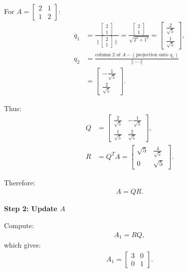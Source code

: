 \documentclass[journal]{IEEEtran}
\begin{document}
\begin{enumerate}
For $A = \begin{bmatrix} 2 & 1 \\ 1 & 2 \end{bmatrix}$:
\begin{align}
    q_1 &= \frac{\begin{bmatrix} 2 \\ 1 \end{bmatrix}}{\|\begin{bmatrix} 2 \\ 1 \end{bmatrix}\|} 
    = \frac{\begin{bmatrix} 2 \\ 1 \end{bmatrix}}{\sqrt{2^2 + 1^2}} 
    = \begin{bmatrix} \frac{2}{\sqrt{5}} \\ \frac{1}{\sqrt{5}} \end{bmatrix}, \\
    q_2 &= \frac{\text{column 2 of } A - (\text{projection onto } q_1)}{\| \cdots \|} \\
    &= \begin{bmatrix} -\frac{1}{\sqrt{5}} \\ \frac{2}{\sqrt{5}} \end{bmatrix}.
\end{align}

Thus:
\begin{align}
    Q &= \begin{bmatrix} \frac{2}{\sqrt{5}} & -\frac{1}{\sqrt{5}} \\ \frac{1}{\sqrt{5}} & \frac{2}{\sqrt{5}} \end{bmatrix}, \\
    R &= Q^T A = \begin{bmatrix} \sqrt{5} & \frac{4}{\sqrt{5}} \\ 0 & \sqrt{5} \end{bmatrix}.
\end{align}

Therefore:
\begin{align}
    A = Q R.
\end{align}

\textbf{Step 2: Update $A$}

Compute:
\begin{align}
    A_1 = R Q,
\end{align}
which gives:
\begin{align}
    A_1 = \begin{bmatrix} 3 & 0 \\ 0 & 1 \end{bmatrix}.
\end{align}


\end{enumerate}
\end{document}
